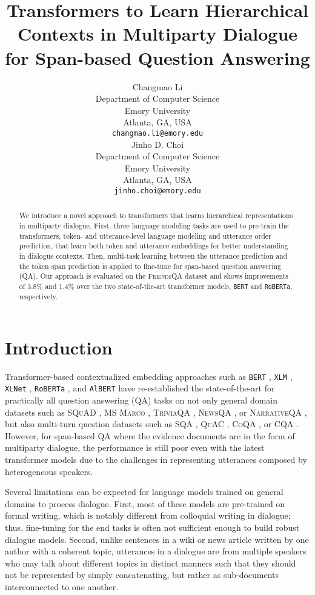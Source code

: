 \documentclass[11pt,a4paper]{article}
\title{Transformers to Learn Hierarchical Contexts in Multiparty Dialogue\\for Span-based Question Answering}
\author{Changmao Li \\
  Department of Computer Science \\
  Emory University \\
  Atlanta, GA, USA \\
  \texttt{changmao.li@emory.edu} \\\And
  Jinho D. Choi\\
  Department of Computer Science \\
  Emory University \\
  Atlanta, GA, USA \\
  \texttt{jinho.choi@emory.edu} \\}
\date{}
\begin{document}
\maketitle

\begin{abstract}
We introduce a novel approach to transformers that learns hierarchical representations in multiparty dialogue.
First, three language modeling tasks are used to pre-train the transformers, token- and utterance-level language modeling and utterance order prediction, that learn both token and utterance embeddings for better understanding in dialogue contexts.
Then, multi-task learning between the utterance prediction and the token span prediction is applied to fine-tune for span-based question answering (QA).
Our approach is evaluated on the \textsc{FriendsQA} dataset and shows improvements of 3.8\% and 1.4\% over the two state-of-the-art transformer models, \texttt{BERT} and \texttt{RoBERTa}, respectively.

\end{abstract} \section{Introduction}
\label{sec:introduction}

Transformer-based contextualized embedding approaches such as \texttt{BERT} \cite{devlin_2019}, \texttt{XLM} \cite{lample_2019}, \texttt{XLNet} \cite{yang_2019a}, \texttt{RoBERTa} \cite{liu_2019}, and \texttt{AlBERT} \cite{lan_2019} have re-established the state-of-the-art for practically all question answering (QA) tasks on not only general domain datasets such as \textsc{SQuAD} \cite{Rajpurkar_2016,Rajpurkar_2018}, \textsc{MS Marco} \cite{bajaj_2016}, \textsc{TriviaQA} \cite{Joshi_2017}, \textsc{NewsQA} \cite{Trischler_2017}, or \textsc{NarrativeQA} \cite{Ko_isk__2018}, but also multi-turn question datasets such as \textsc{SQA} \cite{iyyer_2017}, \textsc{QuAC} \cite{Choi_2018}, \textsc{CoQA} \cite{Reddy_2019}, or CQA \cite{Talmor_2018}.
However, for span-based QA where the evidence documents are in the form of multiparty dialogue, the performance is still poor even with the latest transformer models \cite{Sun_2019,yang_2019}  due to the challenges in representing utterances composed by heterogeneous speakers.


Several limitations can be expected for language models trained on general domains to process dialogue.
First, most of these models are pre-trained on formal writing, which is notably different from colloquial writing in dialogue; thus, fine-tuning for the end tasks is often not sufficient enough to build robust dialogue models.
Second, unlike sentences in a wiki or news article written by one author with a coherent topic, utterances in a dialogue are from multiple speakers who may talk about different topics in distinct manners such that they should not be represented by simply concatenating, but rather as sub-documents interconnected to one another.
\end{document}
